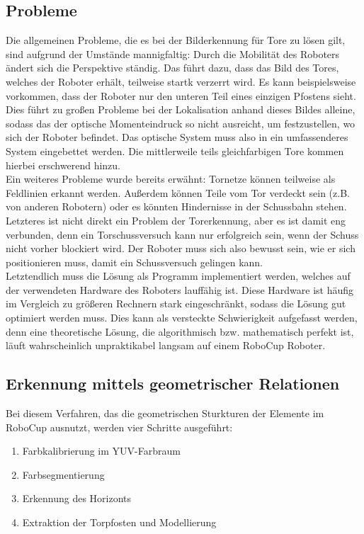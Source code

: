 \documentclass[a4paper,12pt]{article}
\begin{document}
\subsection{Probleme}
Die allgemeinen Probleme, die es bei der Bilderkennung für Tore zu lösen gilt, sind aufgrund
der Umstände mannigfaltig: Durch die Mobilität des Roboters ändert sich die Perspektive ständig. Das
führt dazu, dass das Bild des Tores, welches der Roboter erhält, teilweise startk verzerrt wird. Es
kann beispielsweise vorkommen, dass der Roboter nur den unteren Teil eines einzigen Pfostens sieht.
Dies führt zu großen Probleme bei der Lokalisation anhand dieses Bildes alleine, sodass das der
optische Momenteindruck so nicht ausreicht, um festzustellen, wo sich der Roboter befindet. Das
optische System muss also in ein umfassenderes System eingebettet werden. Die mittlerweile teils
gleichfarbigen Tore kommen hierbei erschwerend hinzu. \\

Ein weiteres Probleme wurde bereits erwähnt: Tornetze können teilweise als Feldlinien erkannt
werden. Außerdem können Teile vom Tor verdeckt sein (z.B. von anderen Robotern) oder es könnten
Hindernisse in der Schussbahn stehen. Letzteres ist nicht direkt ein Problem der Torerkennung, aber
es ist damit eng verbunden, denn ein Torschussversuch kann nur erfolgreich sein, wenn der Schuss
nicht vorher blockiert wird. Der Roboter muss sich also bewusst sein, wie er sich positionieren
muss, damit ein Schussversuch gelingen kann. \\

Letztendlich muss die Lösung als Programm implementiert werden, welches auf der
verwendeten Hardware des Roboters lauffähig ist. Diese Hardware ist häufig
im Vergleich zu größeren Rechnern stark eingeschränkt, sodass die Lösung
gut optimiert werden muss. Dies kann als versteckte Schwierigkeit aufgefasst
werden, denn eine theoretische Lösung, die algorithmisch bzw. mathematisch 
perfekt ist, läuft wahrscheinlich unpraktikabel langsam auf einem RoboCup
Roboter.

\newpage
\subsection{Erkennung mittels geometrischer Relationen}
Bei diesem Verfahren, das die geometrischen Sturkturen der Elemente im RoboCup ausnutzt, werden
vier Schritte ausgeführt:
\begin{enumerate}
	\item Farbkalibrierung im YUV-Farbraum
	\item Farbsegmentierung
	\item Erkennung des Horizonts
	\item Extraktion der Torpfosten und Modellierung
\end{enumerate}
\end{document}

